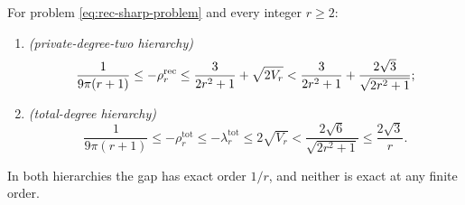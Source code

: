 \begin{theorem}\label{thm:affine-sharp}
For problem \eqref{eq:rec-sharp-problem} and every integer $r\ge2$:
\begin{enumerate}[label=(\alph*)]
\item \emph{(private-degree-two hierarchy)}
  \[
    \frac1{9\pi(r+1)}\le-\rho^{\mathrm{rec}}_r\le\frac3{2r^2+1}+\sqrt{2V_r}
    <\frac3{2r^2+1}+\frac{2\sqrt3}{\sqrt{2r^2+1}} ;
  \]
\item \emph{(total-degree hierarchy)}
  \[
    \frac1{9\pi(r+1)}\le-\rho^{\mathrm{tot}}_r\le-\lambda^{\mathrm{tot}}_r
    \le2\sqrt{V_r}<\frac{2\sqrt6}{\sqrt{2r^2+1}}\le\frac{2\sqrt3}r .
  \]
\end{enumerate}
In both hierarchies the gap has exact order $1/r$, and neither is exact at
any finite order.
\end{theorem}

